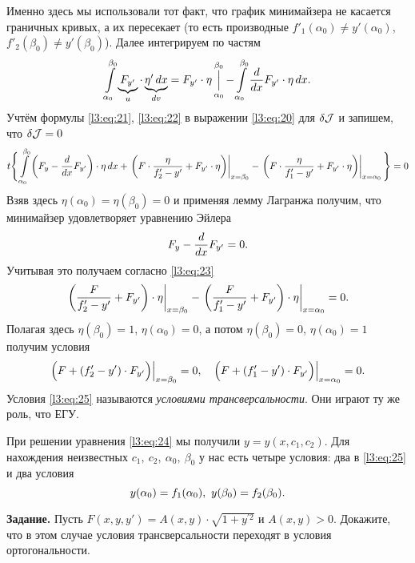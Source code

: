 Именно здесь мы использовали тот факт, что график минимайзера не касается граничных кривых, а их пересекает (то есть производные $f'_1(\alpha_0)\neq y'(\alpha_0)$,\ $f'_2(\beta_0)\neq y'(\beta_0)$). Далее интегрируем по частям 
\begin{equation}
	\label{l3:eq:22}
	\int\limits_{\alpha_0}^{\beta_0}\underbrace{F_{y'}}_{u}\cdot\underbrace{\eta'\,dx}_{dv}=F_{y'}\cdot\eta\mathop{\Big|}\limits_{\alpha_0}^{\beta_0}-\int\limits_{\alpha_0}^{\beta_0}\frac{d}{dx}F_{y'}\cdot\eta\,dx.
\end{equation}
Учтём формулы \eqref{l3:eq:21}, \eqref{l3:eq:22} в выражении \eqref{l3:eq:20} для $\delta\mathcal{J}$ и запишем, что $\delta\mathcal{J}=0$
\begin{equation}
	\label{l3:eq:23}
	t\Bigg\{\int\limits_{\alpha_0}^{\beta_0}\left(F_{y}-\frac{d}{dx}F_{y'}\right)\cdot\eta\,dx+\left.\left(F\cdot\frac{\eta}{f'_2-y'}+F_{y'}\cdot\eta\right)\right|_{x=\beta_0}-\left.\left(F\cdot\frac{\eta}{f'_1-y'}+F_{y'}\cdot\eta\right)\right|_{x=\alpha_0}\Bigg\}=0
\end{equation}
Взяв здесь $\eta(\alpha_0)=\eta(\beta_0)=0$ и применяя лемму Лагранжа получим, что минимайзер удовлетворяет уравнению Эйлера 
\begin{equation}
	\label{l3:eq:24}
	\hfill F_{y}-\der{}{x}F_{y'}=0.\hfill
\end{equation}
Учитывая это получаем согласно \eqref{l3:eq:23} 
\begin{equation*}
	\hfill\left.\left(\frac{F}{f'_2-y'}+F_{y'}\right)\cdot\eta\right|_{x=\beta_0}-\left.\left(\frac{F}{f'_1-y'}+F_{y'}\right)\cdot\eta\right|_{x=\alpha_0}=0.\hfill
\end{equation*}
Полагая здесь $\eta(\beta_0)=1$, $\eta(\alpha_0)=0$, а потом $\eta(\beta_0)=0$, $\eta(\alpha_0)=1$ получим условия
\begin{equation}
	\label{l3:eq:25}
	\hfill \Big(F+(f'_2-y')\cdot F_{y'}\Big)\Big|_{x=\beta_0}=0,\quad \Big(F+(f'_1-y')\cdot F_{y'}\Big)\Big|_{x=\alpha_0}=0.\hfill
\end{equation}
Условия \eqref{l3:eq:25} называются \emph{условиями трансверсальности}. Они играют ту же роль, что ЕГУ.

При решении уравнения \eqref{l3:eq:24} мы получили $y=y(x,c_1,c_2)$. Для нахождения неизвестных $c_1,\ c_2,\ \alpha_0,\ \beta_0$ у нас есть четыре условия: два в \eqref{l3:eq:25} и два условия
\begin{equation*}
	\hfill y(\alpha_0)=f_1(\alpha_0),\ y(\beta_0)=f_2(\beta_0).\hfill
\end{equation*}
\vspace{0.2cm}

\noindent\textbf{Задание. }Пусть $F(x,y,y')=A(x,y)\cdot\sqrt{1+y^{\prime2}}$ и $A(x,y)>0$. Докажите, что в этом случае условия трансверсальности переходят в условия ортогональности. 